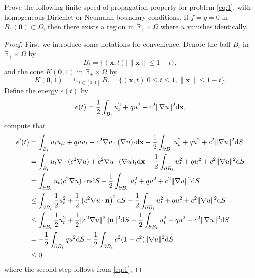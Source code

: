 \begin{pro}
  Prove the following finite speed of propagation property for problem \eqref{eq:1},
  with homogeneous Dirichlet or Neumann boundary conditions.
  If $f=g=0$ in $B_1(\mathbf{0})\subset\Omega$,
  then there exists a region in $\mathbb{R}_+\times\Omega$
  where $u$ vanishes identically.
\end{pro}
\begin{proof}
  First we introduce some notations for convenience.
  Denote the ball $B_t$
  in $\mathbb{R}_+\times\Omega$ by
  \begin{displaymath}
    B_t = \{(\mathbf{x}, t)| \|\mathbf{x}\|\le 1-t\},
  \end{displaymath}
  and the cone $K(\mathbf{0}, 1)$ in $\mathbb{R}_+\times\Omega$ by
  \begin{displaymath}
    K(\mathbf{0}, 1) = \cup_{t\in[0,1]}B_t
    = \{(\mathbf{x},t) | 0\le t\le 1, \|\mathbf{x}\|\le 1-t\}.
  \end{displaymath}
  Define the energy $e(t)$ by
  \begin{displaymath}
    e(t) = \frac{1}{2}\int_{B_t}u_t^2+qu^2+c^2\|\nabla u\|^2\mathrm{d} \mathbf{x},
  \end{displaymath}
  compute that
  \begin{align*}
    e'(t) &= \int_{B_t}u_tu_{tt} + quu_t+c^2\nabla u\cdot(\nabla u)_t\mathrm{d}\mathbf{x} - \frac{1}{2}\int_{\partial B_t}u_t^2+qu^2+c^2\|\nabla u\|^2\mathrm{d} S \\
          &= \int_{B_t}u_t\nabla\cdot(c^2\nabla u) + c^2\nabla u\cdot(\nabla u)_t\mathrm{d}\mathbf{x} - \frac{1}{2}\int_{\partial B_t}u_t^2+qu^2+c^2\|\nabla u\|^2\mathrm{d} S \\
          &= \int_{\partial B_t}u_t(c^2\nabla u)\cdot \mathbf{n}\mathrm{d} S - \frac{1}{2}\int_{\partial B_t}u_t^2+qu^2+c^2\|\nabla u\|^2\mathrm{d} S \\
          &\le \int_{\partial B_t}\frac{1}{2}u_t^2 + \frac{1}{2}\left( c^2\nabla u\cdot \mathbf{n}\right)^2\mathrm{d} S - \frac{1}{2}\int_{\partial B_t}u_t^2+qu^2+c^2\|\nabla u\|^2\mathrm{d} S \\
          &\le \int_{\partial B_t}\frac{1}{2}u_t^2 + \frac{1}{2}\|c^2\nabla u\|^2\|\mathbf{n}\|^2\mathrm{d} S - \frac{1}{2}\int_{\partial B_t}u_t^2+qu^2+c^2\|\nabla u\|^2\mathrm{d} S \\
          &= -\frac{1}{2}\int_{\partial B_t}qu^2\mathrm{d} S - \frac{1}{2}\int_{\partial B_t}c^2(1-c^2)\|\nabla u\|^2\mathrm{d} S \\
    &\le 0
  \end{align*}
  where the second step follows from \eqref{eq:1},

\end{proof}
